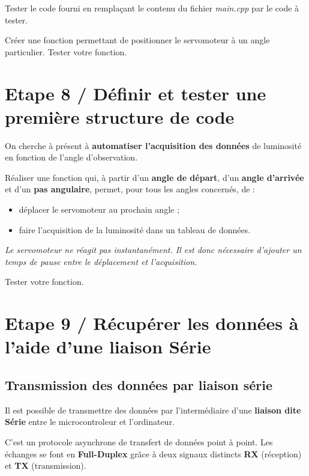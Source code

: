 \documentclass[a4paper,11pt,titlepage]{article} %
\begin{document}
\Manip Tester le code fourni en remplaçant le contenu du fichier \textit{main.cpp} par le code à tester.

\Manip Créer une fonction permettant de positionner le servomoteur à un angle particulier. Tester votre fonction. 

\newpage
\section{Etape 8 / Définir et tester une première structure de code}

On cherche à présent à \textbf{automatiser l'acquisition des données} de luminosité en fonction de l'angle d'observation.

\Manip Réaliser une fonction qui, à partir d'un \textbf{angle de départ}, d'un \textbf{angle d'arrivée} et d'un \textbf{pas angulaire}, permet, pour tous les angles concernés, de :

\begin{itemize}
	\item déplacer le servomoteur au prochain angle ;
	\item faire l'acquisition de la luminosité dans un tableau de données.
\end{itemize}

\textit{Le servomoteur ne réagit pas instantanément. Il est donc nécessaire d'ajouter un temps de pause entre le déplacement et l'acquisition.}

\Manip Tester votre fonction.


\section{Etape 9 / Récupérer les données à l'aide d'une liaison Série}

\subsection{Transmission des données par liaison série}

Il est possible de transmettre des données par l'intermédiaire d'une \textbf{liaison dite Série} entre le microcontroleur et l'ordinateur.

C'est un protocole asynchrone de transfert de données point à point. Les échanges se font en \textbf{Full-Duplex} grâce à deux signaux distincts \textbf{RX} (réception) et \textbf{TX} (transmission).
\end{document}
